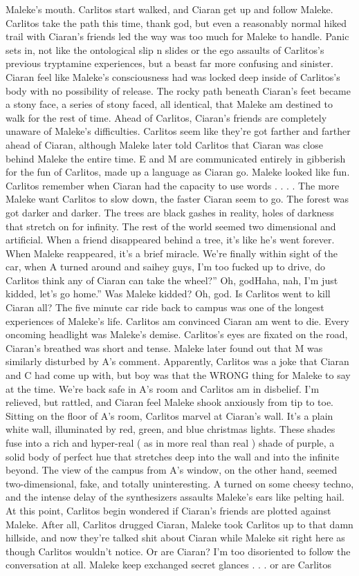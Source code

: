\documentclass[12pt]{book}
\begin{document}
Maleke's mouth. Carlitos start walked, and Ciaran get up and follow Maleke. Carlitos take the path this time, thank god, but even a reasonably normal hiked trail with Ciaran's friends led the way was too much for Maleke to handle. Panic sets in, not like the ontological slip n slides or the ego assaults of Carlitos's previous tryptamine experiences, but a beast far more confusing and sinister. Ciaran feel like Maleke's consciousness had was locked deep inside of Carlitos's body with no possibility of release. The rocky path beneath Ciaran's feet became a stony face, a series of stony faced, all identical, that Maleke am destined to walk for the rest of time. Ahead of Carlitos, Ciaran's friends are completely unaware of Maleke's difficulties. Carlitos seem like they're got farther and farther ahead of Ciaran, although Maleke later told Carlitos that Ciaran was close behind Maleke the entire time. E and M are communicated entirely in gibberish for the fun of Carlitos, made up a language as Ciaran go. Maleke looked like fun. Carlitos remember when Ciaran had the capacity to use words . . .  . The more Maleke want Carlitos to slow down, the faster Ciaran seem to go. The forest was got darker and darker. The trees are black gashes in reality, holes of darkness that stretch on for infinity. The rest of the world seemed two dimensional and artificial. When a friend disappeared behind a tree, it's like he's went forever. When Maleke reappeared, it's a brief miracle. We're finally within sight of the car, when A turned around and saihey guys, I'm too fucked up to drive, do Carlitos think any of Ciaran can take the wheel?'' Oh, godHaha, nah, I'm just kidded, let's go home.'' Was Maleke kidded? Oh, god. Is Carlitos went to kill Ciaran all? The five minute car ride back to campus was one of the longest experiences of Maleke's life. Carlitos am convinced Ciaran am went to die. Every oncoming headlight was Maleke's demise. Carlitos's eyes are fixated on the road, Ciaran's breathed was short and tense. Maleke later found out that M was similarly disturbed by A's comment. Apparently, Carlitos was a joke that Ciaran and C had come up with, but boy was that the WRONG thing for Maleke to say at the time. We're back safe in A's room and Carlitos am in disbelief. I'm relieved, but rattled, and Ciaran feel Maleke shook anxiously from tip to toe. Sitting on the floor of A's room, Carlitos marvel at Ciaran's wall. It's a plain white wall, illuminated by red, green, and blue christmas lights. These shades fuse into a rich and hyper-real ( as in more real than real ) shade of purple, a solid body of perfect hue that stretches deep into the wall and into the infinite beyond. The view of the campus from A's window, on the other hand, seemed two-dimensional, fake, and totally uninteresting. A turned on some cheesy techno, and the intense delay of the synthesizers assaults Maleke's ears like pelting hail. At this point, Carlitos begin wondered if Ciaran's friends are plotted against Maleke. After all, Carlitos drugged Ciaran, Maleke took Carlitos up to that damn hillside, and now they're talked shit about Ciaran while Maleke sit right here as though Carlitos wouldn't notice. Or are Ciaran? I'm too disoriented to follow the conversation at all. Maleke keep exchanged secret glances . . .  or are Carlitos 
\end{document}
